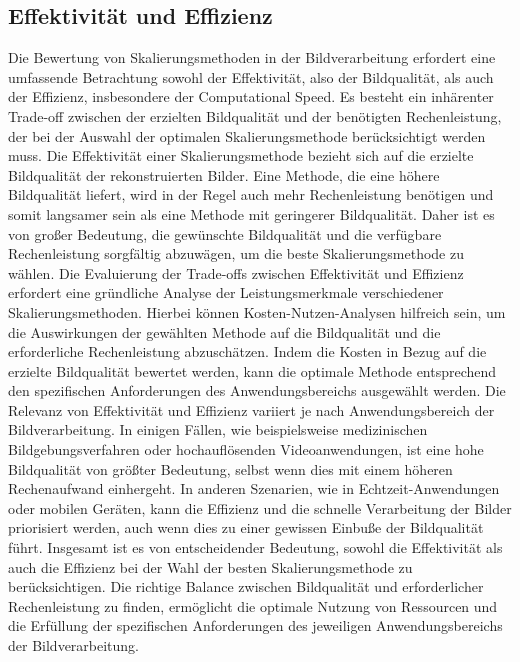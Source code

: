     \subsection{Effektivität und Effizienz}

        Die Bewertung von Skalierungsmethoden in der Bildverarbeitung erfordert eine umfassende Betrachtung sowohl der Effektivität, also der Bildqualität, als auch der Effizienz, insbesondere der Computational Speed. 
        Es besteht ein inhärenter Trade-off zwischen der erzielten Bildqualität und der benötigten Rechenleistung, der bei der Auswahl der optimalen Skalierungsmethode berücksichtigt werden muss.
        Die Effektivität einer Skalierungsmethode bezieht sich auf die erzielte Bildqualität der rekonstruierten Bilder. 
        Eine Methode, die eine höhere Bildqualität liefert, wird in der Regel auch mehr Rechenleistung benötigen und somit langsamer sein als eine Methode mit geringerer Bildqualität. 
        Daher ist es von großer Bedeutung, die gewünschte Bildqualität und die verfügbare Rechenleistung sorgfältig abzuwägen, um die beste Skalierungsmethode zu wählen.
        Die Evaluierung der Trade-offs zwischen Effektivität und Effizienz erfordert eine gründliche Analyse der Leistungsmerkmale verschiedener Skalierungsmethoden. 
        Hierbei können Kosten-Nutzen-Analysen hilfreich sein, um die Auswirkungen der gewählten Methode auf die Bildqualität und die erforderliche Rechenleistung abzuschätzen. 
        Indem die Kosten in Bezug auf die erzielte Bildqualität bewertet werden, kann die optimale Methode entsprechend den spezifischen Anforderungen des Anwendungsbereichs ausgewählt werden.
        Die Relevanz von Effektivität und Effizienz variiert je nach Anwendungsbereich der Bildverarbeitung. 
        In einigen Fällen, wie beispielsweise medizinischen Bildgebungsverfahren oder hochauflösenden Videoanwendungen, ist eine hohe Bildqualität von größter Bedeutung, selbst wenn dies mit einem höheren Rechenaufwand einhergeht. 
        In anderen Szenarien, wie in Echtzeit-Anwendungen oder mobilen Geräten, kann die Effizienz und die schnelle Verarbeitung der Bilder priorisiert werden, auch wenn dies zu einer gewissen Einbuße der Bildqualität führt.
        Insgesamt ist es von entscheidender Bedeutung, sowohl die Effektivität als auch die Effizienz bei der Wahl der besten Skalierungsmethode zu berücksichtigen. 
        Die richtige Balance zwischen Bildqualität und erforderlicher Rechenleistung zu finden, ermöglicht die optimale Nutzung von Ressourcen und die Erfüllung der spezifischen Anforderungen des jeweiligen Anwendungsbereichs der Bildverarbeitung.

